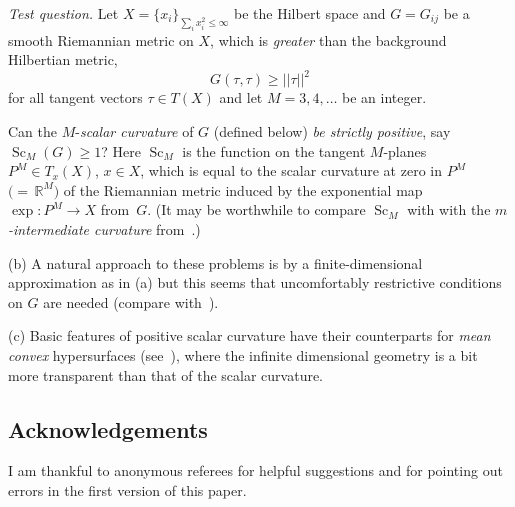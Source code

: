 \documentclass[10pt,a4paper]{amsart}
\numberwithin{equation}{section}
\begin{document}
 {\it Test question.} Let $X=\{x_i\}_{\sum_i x_i^2\leq\infty}$ be the Hilbert space and $G=G_{ij}$ be a smooth Riemannian metric on $X$, which is {\it greater} than the background Hilbertian metric,{\samepage
\[
G(\tau,\tau)\geq ||\tau||^2
\]
 for all tangent vectors $ \tau\in T(X)$ and let $M=3,4,\dots$ be an integer.}

 Can the $M$-{\it scalar curvature} of $G$ (defined below) {\it be strictly positive}, say
$\operatorname{Sc}_M(G)\geq 1$?
 Here $\operatorname{Sc}_M$ is the function on the tangent $M$-planes
 $P^M\in T_x(X)$, $x\in X$, which is equal to the scalar curvature at zero in $P^M$ $\bigl({=}\,\mathbb R^M\bigr)$ of the Riemannian metric induced by the exponential map $\exp\colon P^M\to X$ from~$G$. (It may be worthwhile to compare $\operatorname{Sc}_M$ with
 with the {\it $m$-intermediate curvature} from~\cite{BHG2022}.)

(b) A natural approach to these problems is by a finite-dimensional approximation as in (a) but this seems that uncomfortably restrictive conditions on $G$
are needed (compare with~\cite{Gr2014}).

(c) Basic features of positive scalar curvature have their counterparts
for {\it mean convex} hypersurfaces (see~\cite{Gr2019}), where the infinite dimensional geometry is a bit more transparent than that of the scalar curvature.

\subsection*{Acknowledgements}
I am thankful to anonymous referees for helpful suggestions and for pointing out errors in the first version of this paper.

\end{document}
